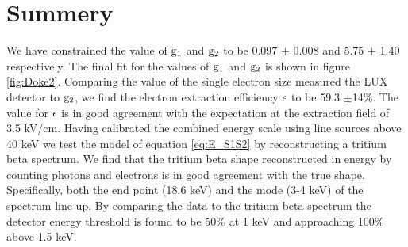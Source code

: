 \section{Summery}

We have constrained the value of $\rm g_1$ and $\rm g_2$ to be 0.097 $\pm$ 0.008 and 5.75 $\pm$ 1.40 respectively. The final fit for the values of $\rm g_1$ and $\rm g_2$ is shown in figure \ref{fig:Doke2}. Comparing the value of the single electron size measured the LUX detector to $\rm g_2$, we find the electron extraction efficiency $\rm \epsilon$ to be  59.3 $\pm$14\%. The value for $\rm \epsilon$ is in good agreement with the expectation at the extraction field of 3.5 kV/cm. Having calibrated the combined energy scale using line sources above 40 keV we test the model of equation \ref{eq:E_S1S2} by reconstructing a tritium beta spectrum. We find that the tritium beta shape reconstructed in energy by counting photons and electrons is in good agreement with the true shape. Specifically, both the end point (18.6 keV) and the mode (3-4 keV) of the spectrum line up. By comparing the data to the tritium beta spectrum the detector energy threshold is found to be 50\% at 1 keV and approaching 100\% above 1.5 keV.


